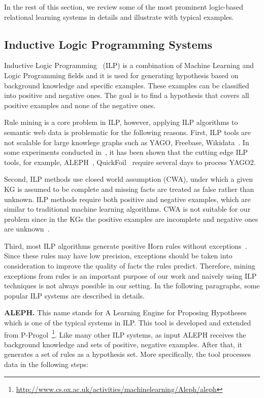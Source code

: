 In the rest of this section, we review some of the most prominent logic-based relational learning systems in details and illustrate with typical examples.

\subsection{Inductive Logic Programming Systems}

Inductive Logic Programming~\cite{ref9} (ILP) is a combination of Machine Learning and Logic Programming fields and it is used for generating hypothesis based on background knowledge and specific examples. These examples can be classified into positive and negative ones. The goal is to find a hypothesis that covers all positive examples and none of the negative ones.

Rule mining is a core problem in ILP, however, applying ILP algorithms to semantic web data is problematic for the following reasons. First, ILP tools are not scalable for large knowlege graphs such as YAGO, Freebase, Wikidata~\cite{ref10}. In some experiments conducted in~\cite{ref10}, it has been shown that the cutting edge ILP tools, for example, ALEPH~\cite{ref14, ref10}, QuickFoil~\cite{ref15, ref10} require several days to process YAGO2.

Second, ILP methods use closed world assumption (CWA), under which a given KG is assumed to be complete and missing facts are treated as false rather than unknown. ILP methods require both positive and negative examples, which are similar to traditional machine learning algorithms. CWA is not suitable for our problem since in the KGs the positive examples are incomplete and negative ones are unknown~\cite{ref10}.

Third, most ILP algorithms generate positive Horn rules without exceptions~\cite{ref11}. Since these rules may have low precision, exceptions should be taken into consideration to improve the quality of facts the rules predict. Therefore, mining exceptions from rules is an important purpose of our work and naively using ILP techniques is not always possible in our setting. In the following paragraphs, some popular ILP systems are described in details.

\textbf{ALEPH.} This name stands for A Learning Engine for Proposing Hypotheses which is one of the typical systems in ILP. This tool is developed and extended from P-Progol~\footnote{\url{http://www.cs.ox.ac.uk/activities/machinelearning/Aleph/aleph}}. Like many other ILP systems, as input ALEPH receives the background knowledge and sets of positive, negative examples. After that, it generates a set of rules as a hypothesis set. More specifically, the tool processes data in the following steps:

